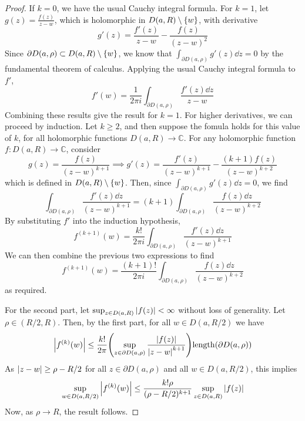 \begin{proof}
	If \( k = 0 \), we have the usual Cauchy integral formula.
	For \( k = 1 \), let \( g(z) = \frac{f(z)}{z-w} \), which is holomorphic in \( D(a,R) \setminus \qty{w} \), with derivative
	\[
		g'(z) = \frac{f'(z)}{z-w} - \frac{f(z)}{(z-w)^2}
	\]
	Since \( \partial D(a,\rho) \subset D(a,R) \setminus \qty{w} \), we know that \( \int_{\partial D(a,\rho)} g'(z) \dd{z} = 0 \) by the fundamental theorem of calculus.
	Applying the usual Cauchy integral formula to \( f' \),
	\[
		f'(w) = \frac{1}{2\pi i}\int_{\partial D(a,\rho)} \frac{f'(z) \dd{z}}{z-w}
	\]
	Combining these results give the result for \( k = 1 \).
	For higher derivatives, we can proceed by induction.
	Let \( k \geq 2 \), and then suppose the fomula holds for this value of \( k \), for all holomorphic functions \( D(a,R) \to \mathbb C \).
	For any holomorphic function \( f \colon D(a,R) \to \mathbb C \), consider
	\[
		g(z) = \frac{f(z)}{(z-w)^{k+1}} \implies g'(z) = \frac{f'(z)}{(z-w)^{k+1}} - \frac{(k+1)f(z)}{(z-w)^{k+2}}
	\]
	which is defined in \( D(a,R) \setminus \qty{w} \).
	Then, since \( \int_{\partial D(a,\rho)} g'(z) \dd{z} = 0 \), we find
	\[
		\int_{\partial D(a,\rho)} \frac{f'(z) \dd{z}}{(z-w)^{k+1}} = (k+1) \int_{\partial D(a,\rho)} \frac{f(z) \dd{z}}{(z-w)^{k+2}}
	\]
	By substituting \( f' \) into the induction hypothesis,
	\[
		f^{(k+1)}(w) = \frac{k!}{2\pi i} \int_{\partial D(a,\rho)} \frac{f'(z) \dd{z}}{(z-w)^{k+1}}
	\]
	We can then combine the previous two expressions to find
	\[
		f^{(k+1)}(w) = \frac{(k+1)!}{2\pi i} \int_{\partial D(a,\rho)} \frac{f(z) \dd{z}}{(z-w)^{k+2}}
	\]
	as required.

	For the second part, let \( \sup_{z \in D(a,R)} \abs{f(z)} < \infty \) without loss of generality.
	Let \( \rho \in (R/2, R) \).
	Then, by the first part, for all \( w \in D(a,R/2) \) we have
	\[
		\abs{f^{(k)}(w)} \leq \frac{k!}{2\pi} \qty(\sup_{z \in \partial D(a,\rho)} \frac{\abs{f(z)}}{\abs{z-w}^{k+1}}) \mathrm{length}(\partial D(a,\rho))
	\]
	As \( \abs{z-w} \geq \rho - R/2 \) for all \( z \in \partial D(a,\rho) \) and all \( w \in D(a,R/2) \), this implies
	\[
		\sup_{w \in D(a,R/2)} \abs{f^{(k)}(w)} \leq \frac{k!\rho}{(\rho - R/2)^{k+1}} \sup_{z \in D(a,R)} \abs{f(z)}
	\]
	Now, as \( \rho \to R \), the result follows.
\end{proof}

